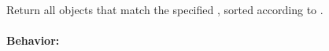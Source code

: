 Return all objects that match the specified , sorted according to
.

\paragraph{Behavior:}
\begin{itemize}[noitemsep]


\end{itemize}
